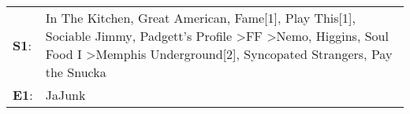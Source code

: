 \begin{supertabular}{p{0.03\textwidth}p{0.92\textwidth}}
 \textbf{S1}:  &  In The Kitchen\textsuperscript{}, \enspace Great American\textsuperscript{}, \enspace Fame[1]\textsuperscript{}, \enspace Play This[1]\textsuperscript{}, \enspace Sociable Jimmy\textsuperscript{}, \enspace Padgett's Profile\textsuperscript{} \textgreater \enspace FF\textsuperscript{} \textgreater \enspace Nemo\textsuperscript{}, \enspace Higgins\textsuperscript{}, \enspace Soul Food I\textsuperscript{} \textgreater \enspace Memphis Underground[2]\textsuperscript{}, \enspace Syncopated Strangers\textsuperscript{}, \enspace Pay the Snucka\textsuperscript{}  \enspace  \\
 \textbf{E1}:  &                                                                                                                                                                                                                                                                                                                                                                                                                                                                                                                                                          JaJunk\textsuperscript{}  \enspace  \\
\end{supertabular}
